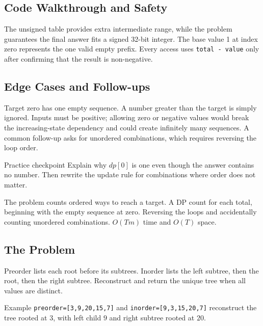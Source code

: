 \subsection{Code Walkthrough and Safety}
The unsigned table provides extra intermediate range, while the problem
guarantees the final answer fits a signed 32-bit integer. The base value 1 at
index zero represents the one valid empty prefix. Every access uses
\texttt{total - value} only after confirming that the result is non-negative.

\subsection{Edge Cases and Follow-ups}
Target zero has one empty sequence. A number greater than the target is simply
ignored. Inputs must be positive; allowing zero or negative values would
break the increasing-state dependency and could create infinitely many
sequences. A common follow-up asks for unordered combinations, which requires
reversing the loop order.

\begin{revisionbox}{Practice checkpoint}
Explain why \(dp[0]\) is one even though the answer contains no number. Then
rewrite the update rule for combinations where order does not matter.
\end{revisionbox}
\chaptercheckpoint
  {The problem counts ordered ways to reach a target.}
  {A DP count for each total, beginning with the empty sequence at zero.}
  {Reversing the loops and accidentally counting unordered combinations.}
  {$O(Tm)$ time and $O(T)$ space.}
\judgeclassnote



\subsection{The Problem}
Preorder lists each root before its subtrees. Inorder lists the left subtree,
then the root, then the right subtree. Reconstruct and return the unique tree
when all values are distinct.

\begin{conceptbox}{Example}
\texttt{preorder=[3,9,20,15,7]} and
\texttt{inorder=[9,3,15,20,7]} reconstruct the tree rooted at \(3\), with
left child \(9\) and right subtree rooted at \(20\).
\end{conceptbox}

